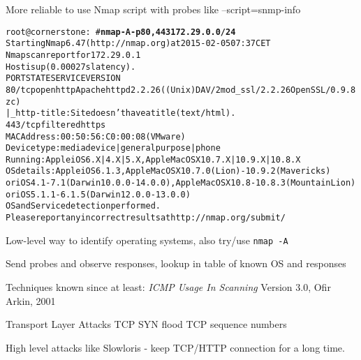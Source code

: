 \documentclass[Screen16to9,17pt]{foils}
\begin{document}
\vskip 5mm
\centerline{More reliable to use Nmap script with probes like --script=snmp-info}

\begin{alltt}\footnotesize
root@cornerstone:~#{\bfseries nmap -A -p80,443 172.29.0.0/24}
Starting Nmap 6.47 ( http://nmap.org ) at 2015-02-05 07:37 CET
Nmap scan report for 172.29.0.1
Host is up (0.00027s latency).
PORT    STATE    SERVICE VERSION
80/tcp  open     http    Apache httpd 2.2.26 ((Unix) DAV/2 mod_ssl/2.2.26 OpenSSL/0.9.8zc)
|_http-title: Site doesn't have a title (text/html).
443/tcp filtered https
MAC Address: 00:50:56:C0:00:08 (VMware)
Device type: media device|general purpose|phone
Running: Apple iOS 6.X|4.X|5.X, Apple Mac OS X 10.7.X|10.9.X|10.8.X
OS details: Apple iOS 6.1.3, Apple Mac OS X 10.7.0 (Lion) - 10.9.2 (Mavericks)
or iOS 4.1 - 7.1 (Darwin 10.0.0 - 14.0.0), Apple Mac OS X 10.8 - 10.8.3 (Mountain Lion)
or iOS 5.1.1 - 6.1.5 (Darwin 12.0.0 - 13.0.0)
OS and Service detection performed.
Please report any incorrect results at http://nmap.org/submit/
\end{alltt}

\begin{list2}
\item Low-level way to identify operating systems, also try/use
  \verb+nmap -A+
\item Send probes and observe responses, lookup in table of known OS and responses
\item Techniques known since at least: \emph{ICMP Usage In Scanning} Version 3.0,
  Ofir Arkin, 2001 %
\end{list2}




\begin{list2}
\item Transport Layer Attacks TCP SYN flood TCP sequence numbers
\item High level attacks like Slowloris - keep TCP/HTTP connection for a long time.
\end{list2}


\end{document}
